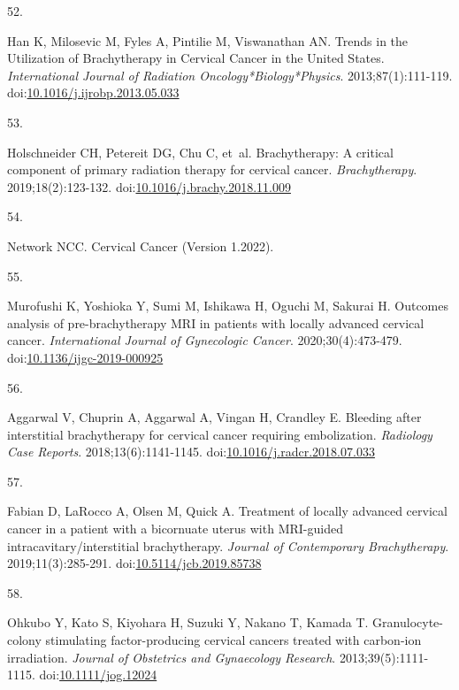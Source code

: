 \documentclass[
  a4paper,
]{scrreprt}
\newlength{\cslhangindent}
\newlength{\csllabelwidth}
\newlength{\cslentryspacingunit} %
\newenvironment{CSLReferences}[2] %
 {%
  \setlength{\parindent}{0pt}
  \ifodd #1
  \let\oldpar\par
  \def\par{\hangindent=\cslhangindent\oldpar}
  \fi
  \setlength{\parskip}{#2\cslentryspacingunit}
 }%
 {}
\newcommand{\CSLLeftMargin}[1]{\parbox[t]{\csllabelwidth}{#1}}
\newcommand{\CSLRightInline}[1]{\parbox[t]{\linewidth - \csllabelwidth}{#1}\break}
\begin{document}
\begin{CSLReferences}{0}{0}
\leavevmode{}%
\CSLLeftMargin{52. }%
\CSLRightInline{Han K, Milosevic M, Fyles A, Pintilie M, Viswanathan AN.
Trends in the Utilization of Brachytherapy in Cervical Cancer in the
United States. \emph{International Journal of Radiation
Oncology*Biology*Physics}. 2013;87(1):111-119.
doi:\href{https://doi.org/10.1016/j.ijrobp.2013.05.033}{10.1016/j.ijrobp.2013.05.033}}

\leavevmode{}%
\CSLLeftMargin{53. }%
\CSLRightInline{Holschneider CH, Petereit DG, Chu C, et~al.
Brachytherapy: A critical component of primary radiation therapy for
cervical cancer. \emph{Brachytherapy}. 2019;18(2):123-132.
doi:\href{https://doi.org/10.1016/j.brachy.2018.11.009}{10.1016/j.brachy.2018.11.009}}

\leavevmode{}%
\CSLLeftMargin{54. }%
\CSLRightInline{Network NCC. Cervical {Cancer} ({Version} 1.2022).}

\leavevmode{}%
\CSLLeftMargin{55. }%
\CSLRightInline{Murofushi K, Yoshioka Y, Sumi M, Ishikawa H, Oguchi M,
Sakurai H. Outcomes analysis of pre-brachytherapy MRI in patients with
locally advanced cervical cancer. \emph{International Journal of
Gynecologic Cancer}. 2020;30(4):473-479.
doi:\href{https://doi.org/10.1136/ijgc-2019-000925}{10.1136/ijgc-2019-000925}}

\leavevmode{}%
\CSLLeftMargin{56. }%
\CSLRightInline{Aggarwal V, Chuprin A, Aggarwal A, Vingan H, Crandley E.
Bleeding after interstitial brachytherapy for cervical cancer requiring
embolization. \emph{Radiology Case Reports}. 2018;13(6):1141-1145.
doi:\href{https://doi.org/10.1016/j.radcr.2018.07.033}{10.1016/j.radcr.2018.07.033}}

\leavevmode{}%
\CSLLeftMargin{57. }%
\CSLRightInline{Fabian D, LaRocco A, Olsen M, Quick A. Treatment of
locally advanced cervical cancer in a patient with a bicornuate uterus
with MRI-guided intracavitary/interstitial brachytherapy. \emph{Journal
of Contemporary Brachytherapy}. 2019;11(3):285-291.
doi:\href{https://doi.org/10.5114/jcb.2019.85738}{10.5114/jcb.2019.85738}}

\leavevmode{}%
\CSLLeftMargin{58. }%
\CSLRightInline{Ohkubo Y, Kato S, Kiyohara H, Suzuki Y, Nakano T, Kamada
T. Granulocyte-colony stimulating factor-producing cervical cancers
treated with carbon-ion irradiation. \emph{Journal of Obstetrics and
Gynaecology Research}. 2013;39(5):1111-1115.
doi:\href{https://doi.org/10.1111/jog.12024}{10.1111/jog.12024}}


\end{CSLReferences}
\end{document}
